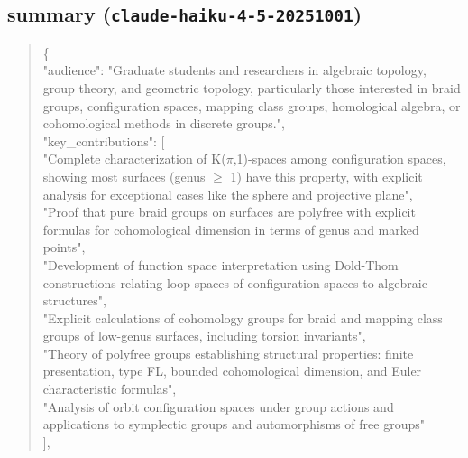 \documentclass[11pt]{article}
\begin{document}
\subsection*{summary (\texttt{claude-haiku-4-5-20251001})}
\begin{quote}\small\ttfamily\raggedright
\{\\
  "audience": "Graduate students and researchers in algebraic topology, group theory, and geometric topology, particularly those interested in braid groups, configuration spaces, mapping class groups, homological algebra, or cohomological methods in discrete groups.",\\
  "key\_contributions": [\\
    "Complete characterization of K(\ensuremath{\pi},1)-spaces among configuration spaces, showing most surfaces (genus \ensuremath{\ge} 1) have this property, with explicit analysis for exceptional cases like the sphere and projective plane",\\
    "Proof that pure braid groups on surfaces are polyfree with explicit formulas for cohomological dimension in terms of genus and marked points",\\
    "Development of function space interpretation using Dold-Thom constructions relating loop spaces of configuration spaces to algebraic structures",\\
    "Explicit calculations of cohomology groups for braid and mapping class groups of low-genus surfaces, including torsion invariants",\\
    "Theory of polyfree groups establishing structural properties: finite presentation, type FL, bounded cohomological dimension, and Euler characteristic formulas",\\
    "Analysis of orbit configuration spaces under group actions and applications to symplectic groups and automorphisms of free groups"\\
  ],\\

\end{quote}
\end{document}
